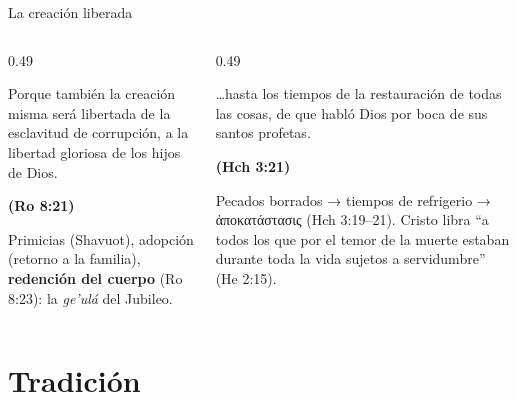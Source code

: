 \documentclass[hyperref={bookmarks=false},aspectratio=169]{beamer}
\newcommand{\grc}[1]{\foreignlanguage{ancientgreek}{#1}}
\newcommand{\fuente}[1]{\par\hfill{\upshape\bfseries\footnotesize\textcolor{tierraroja}{#1}}}
\newcommand{\destacar}[1]{\textbf{\textcolor{tierraroja}{#1}}}
\begin{document}
\begin{frame}{La creación liberada}
\begin{columns}[t,onlytextwidth]
\begin{column}{0.49\textwidth}
\begin{cita}Porque también la creación misma será libertada de la esclavitud de corrupción, a la libertad gloriosa de los hijos de Dios.\fuente{(Ro 8:21)}\end{cita}
\scriptsize Primicias (Shavuot), adopción (retorno a la familia), \destacar{redención del cuerpo} (Ro 8:23): la \emph{ge'ulá} del Jubileo.
\end{column}
\begin{column}{0.49\textwidth}
\begin{cita}\ldots{}hasta los tiempos de la restauración de todas las cosas, de que habló Dios por boca de sus santos profetas.\fuente{(Hch 3:21)}\end{cita}
\scriptsize Pecados borrados → tiempos de refrigerio → \grc{ἀποκατάστασις} (Hch 3:19--21). Cristo libra ``a todos los que por el temor de la muerte estaban durante toda la vida sujetos a servidumbre'' (He 2:15).
\end{column}
\end{columns}
\end{frame}


\section{Tradición}
\end{document}
